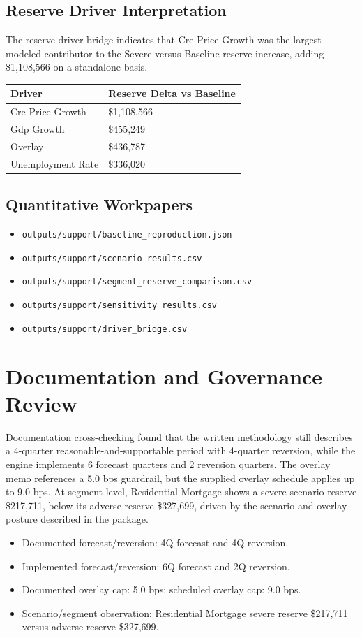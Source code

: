 \documentclass[11pt]{article}
\begin{document}
\subsection*{Reserve Driver Interpretation}
The reserve-driver bridge indicates that Cre Price Growth was the largest modeled contributor to the Severe-versus-Baseline reserve increase, adding \$1,108,566 on a standalone basis.
\begin{center}
\begin{tabularx}{\textwidth}{>{\raggedright\arraybackslash}p{}>{\raggedright\arraybackslash}p{}}
\toprule
Driver & Reserve Delta vs Baseline \\
\midrule
Cre Price Growth & \$1,108,566 \\
Gdp Growth & \$455,249 \\
Overlay & \$436,787 \\
Unemployment Rate & \$336,020 \\
\bottomrule
\end{tabularx}
\end{center}
\subsection*{Quantitative Workpapers}
\begin{itemize}
\item \texttt{outputs/support/baseline\_reproduction.json}
\item \texttt{outputs/support/scenario\_results.csv}
\item \texttt{outputs/support/segment\_reserve\_comparison.csv}
\item \texttt{outputs/support/sensitivity\_results.csv}
\item \texttt{outputs/support/driver\_bridge.csv}
\end{itemize}
\section*{Documentation and Governance Review}
Documentation cross-checking found that the written methodology still describes a 4-quarter reasonable-and-supportable period with 4-quarter reversion, while the engine implements 6 forecast quarters and 2 reversion quarters. The overlay memo references a 5.0 bps guardrail, but the supplied overlay schedule applies up to 9.0 bps. At segment level, Residential Mortgage shows a severe-scenario reserve \$217,711, below its adverse reserve \$327,699, driven by the scenario and overlay posture described in the package.
\begin{itemize}
\item Documented forecast/reversion: 4Q forecast and 4Q reversion.
\item Implemented forecast/reversion: 6Q forecast and 2Q reversion.
\item Documented overlay cap: 5.0 bps; scheduled overlay cap: 9.0 bps.
\item Scenario/segment observation: Residential Mortgage severe reserve \$217,711 versus adverse reserve \$327,699.
\end{itemize}
\end{document}
